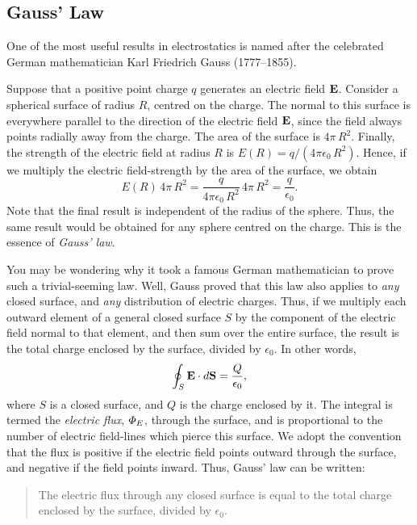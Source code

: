\subsection{Gauss' Law}\label{s4.2}
One of the most useful results in electrostatics is named after the
celebrated German mathematician Karl Friedrich Gauss (1777--1855). 

Suppose that a positive point charge $q$ generates an electric field ${\bf E}$. Consider a spherical 
surface of radius $R$, centred on
the charge. The normal to this surface is everywhere parallel to the direction of the
electric field ${\bf E}$, since the field always points
radially away from the charge. The area of the surface is $4\pi\, R^2$. 
Finally, the strength of the electric field at radius $R$ is $E(R) = q/(4\pi\epsilon_0\,R^2)$. 
Hence, if we multiply the electric field-strength by the  area of the surface, we obtain
\begin{equation}
E(R)\,4\pi \,R^2 = \frac{q}{4\pi\epsilon_0\,R^2} \,4\pi \,R^2 = \frac{q}{\epsilon_0}.
\end{equation}
Note that the final result is independent of the radius of the sphere. Thus,
the same result would be obtained for any sphere centred on the charge. This is
the essence of {\em Gauss' law}. 

You may be wondering why it took a famous German mathematician to prove such a
trivial-seeming  law. 
Well, Gauss proved that this  law also applies to {\em any}\/ closed surface,
and {\em any}\/ distribution of electric charges. Thus, if we
multiply each outward element of a general  closed surface $S$ by the component 
of the electric field normal to that element, and then sum over the
entire surface, the result is the total charge enclosed by the surface, divided
by $\epsilon_0$. In other words,
\begin{equation}
\oint_S {\bf E}\cdot d{\bf S}=\frac{Q}{\epsilon_0},
\end{equation}
where $S$ is a closed surface, and
$Q$ is the charge enclosed by it. The integral is termed the
{\em electric flux}, ${\mit\Phi}_E$, through the surface, and
is proportional to the number of electric field-lines which pierce this surface. We adopt the convention that
the flux is positive if the electric field points outward through the surface, and
negative if the field points inward. Thus, Gauss' law can be written:
\begin{quote}
{\sf The electric flux through any closed surface is equal to the total
charge enclosed by the surface, divided by $\epsilon_0$.}
\end{quote}

